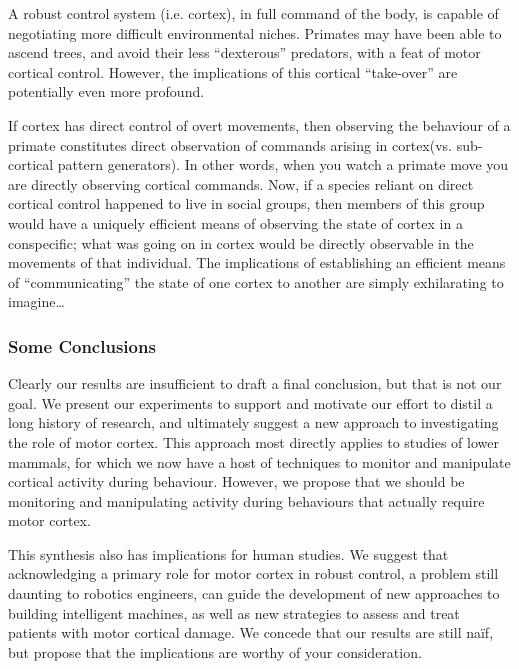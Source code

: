 A robust control system (i.e. cortex), in full command of the body, is capable of negotiating more difficult environmental niches. Primates may have been able to ascend trees, and avoid their less “dexterous” predators, with a feat of motor cortical control. However, the implications of this cortical “take-over” are potentially even more profound. 

If cortex has direct control of overt movements, then observing the behaviour of a primate constitutes direct observation of commands arising in cortex(vs. sub-cortical pattern generators). In other words, when you watch a primate move you are directly observing cortical commands. Now, if a species reliant on direct cortical control happened to live in social groups, then members of this group would have a uniquely efficient means of observing the state of cortex in a conspecific; what was going on in cortex would be directly observable in the movements of that individual. The implications of establishing an efficient means of “communicating” the state of one cortex to another are simply exhilarating to imagine…

\subsubsection*{Some Conclusions}

Clearly our results are insufficient to draft a final conclusion, but that is not our goal. We present our experiments to support and motivate our effort to distil a long history of research, and ultimately suggest a new approach to investigating the role of motor cortex. This approach most directly applies to studies of lower mammals, for which we now have a host of techniques to monitor and manipulate cortical activity during behaviour. However, we propose that we should be monitoring and manipulating activity during behaviours that actually require motor cortex. 

This synthesis also has implications for human studies. We suggest that acknowledging a primary role for motor cortex in robust control, a problem still daunting to robotics engineers, can guide the development of new approaches to building intelligent machines, as well as new strategies to assess and treat patients with motor cortical damage. We concede that our results are still naïf, but propose that the implications are worthy of your consideration.

